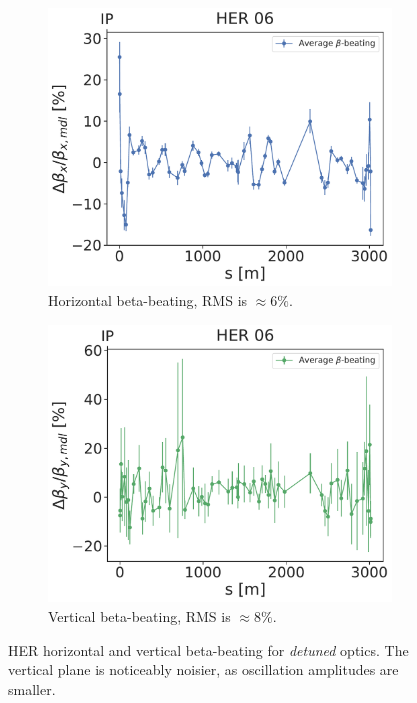 \begin{figure}[!htb]
    \centering
    \begin{subfigure}[b]{0.48\textwidth}
        \includegraphics[width=\linewidth]{images/kek/her_06_bet_x.pdf}
        \caption{Horizontal beta-beating, RMS is $\approx 6\%$.}
    \end{subfigure}
    \hfill
    \begin{subfigure}[b]{0.48\textwidth}
        \includegraphics[width=\linewidth]{images/kek/her_06_bet_y.pdf}
        \caption{Vertical beta-beating, RMS is $\approx 8\%$.}
    \end{subfigure}
    \caption{HER horizontal and vertical beta-beating for \textit{detuned} optics. The vertical
    plane is noticeably noisier, as oscillation amplitudes are smaller.}
    \label{fig:kek:beating_her_detuned}
\end{figure}


